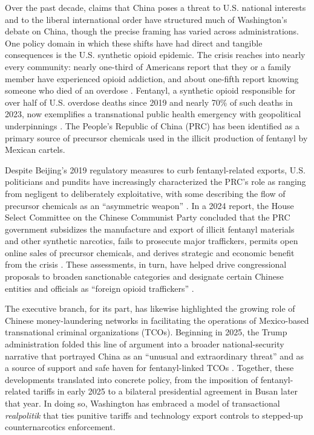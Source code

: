 \documentclass[12pt,letterpaper]{article}
\begin{document}
Over the past decade, claims that China poses a threat to U.S. national interests and to the liberal international order have structured much of Washington's debate on China, though the precise framing has varied across administrations. One policy domain in which these shifts have had direct and tangible consequences is the U.S. synthetic opioid epidemic. The crisis reaches into nearly every community: nearly one-third of Americans report that they or a family member have experienced opioid addiction, and about one-fifth report knowing someone who died of an overdose \citep{hu_blame_2025,saunders_opioid_2026}. Fentanyl, a synthetic opioid responsible for over half of U.S. overdose deaths since 2019 and nearly 70\% of such deaths in 2023, now exemplifies a transnational public health emergency with geopolitical underpinnings \citep{usafacts_are_2025}. The People's Republic of China (PRC) has been identified as a primary source of precursor chemicals used in the illicit production of fentanyl by Mexican cartels. 

Despite Beijing's 2019 regulatory measures to curb fentanyl-related exports, U.S. politicians and pundits have increasingly characterized the PRC's role as ranging from negligent to deliberately exploitative, with some describing the flow of precursor chemicals as an ``asymmetric weapon'' \citep{martinez-fernandez_holding_2024}. In a 2024 report, the House Select Committee on the Chinese Communist Party concluded that the PRC government subsidizes the manufacture and export of illicit fentanyl materials and other synthetic narcotics, fails to prosecute major traffickers, permits open online sales of precursor chemicals, and derives strategic and economic benefit from the crisis \citep{us_house_select_committee_on_the_strategic_competition_between_the_united_states_and_the_chinese_communist_party_ccps_2024}. These assessments, in turn, have helped drive congressional proposals to broaden sanctionable categories and designate certain Chinese entities and officials as ``foreign opioid traffickers'' \citep{barr_hr747_2025}. 

The executive branch, for its part, has likewise highlighted the growing role of Chinese money-laundering networks in facilitating the operations of Mexico-based transnational criminal organizations (TCOs). Beginning in 2025, the Trump administration folded this line of argument into a broader national-security narrative that portrayed China as an ``unusual and extraordinary threat'' and as a source of support and safe haven for fentanyl-linked TCOs \citep{the_white_house_imposing_2025}. Together, these developments translated into concrete policy, from the imposition of fentanyl-related tariffs in early 2025 to a bilateral presidential agreement in Busan later that year. In doing so, Washington has embraced a model of transactional \textit{realpolitik} that ties punitive tariffs and technology export controls to stepped-up counternarcotics enforcement.
\end{document}

